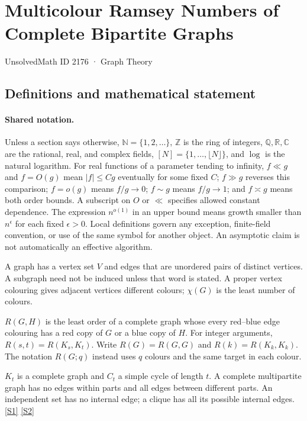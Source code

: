 \documentclass[11pt,a4paper]{article}
\newcommand{\N}{\mathbb{N}}
\newcommand{\Z}{\mathbb{Z}}
\newcommand{\Q}{\mathbb{Q}}
\newcommand{\R}{\mathbb{R}}
\newcommand{\C}{\mathbb{C}}
\newcommand{\sref}[2]{\hyperlink{source:#1:#2}{[S#2]}}
\begin{document}

\setcounter{section}{2175}

\section{Multicolour Ramsey Numbers of Complete Bipartite Graphs}\label{2176}

{\small\sffamily UnsolvedMath ID 2176 · Graph Theory}

\subsection{Definitions and mathematical statement}

\paragraph{Shared notation.}Unless a section says otherwise, $\N=\{1,2,\ldots\}$,
$\Z$ is the ring of integers, $\Q,\R,\C$ are the rational, real, and complex
fields, $[N]=\{1,\ldots,\lfloor N\rfloor\}$, and $\log$ is the natural
logarithm. For real functions of a parameter tending to infinity,
$f\ll g$ and $f=O(g)$ mean $|f|\leq Cg$ eventually for some fixed $C$;
$f\gg g$ reverses this comparison; $f=o(g)$ means $f/g\to0$;
$f\sim g$ means $f/g\to1$; and $f\asymp g$ means both order bounds.
A subscript on $O$ or $\ll$ specifies allowed constant dependence.
The expression $n^{o(1)}$ in an upper bound means growth smaller than
$n^\epsilon$ for each fixed $\epsilon>0$. Local definitions govern any
exception, finite-field convention, or use of the same symbol for another
object. An asymptotic claim is not automatically an effective algorithm.



A graph has a vertex set $V$ and edges that are unordered pairs of distinct vertices. A subgraph need not be induced unless that word is stated. A proper vertex colouring gives adjacent vertices different colours; $\chi(G)$ is the least number of colours.

$R(G,H)$ is the least order of a complete graph whose every red--blue edge colouring has a red copy of $G$ or a blue copy of $H$. For integer arguments, $R(s,t)=R(K_s,K_t)$. Write $R(G)=R(G,G)$ and $R(k)=R(K_k,K_k)$. The notation $R(G;q)$ instead uses $q$ colours and the same target in each colour.

$K_t$ is a complete graph and $C_t$ a simple cycle of length $t$. A complete multipartite graph has no edges within parts and all edges between different parts. An independent set has no internal edge; a clique has all its possible internal edges. \sref{2176}{1} \sref{2176}{2}
\end{document}
